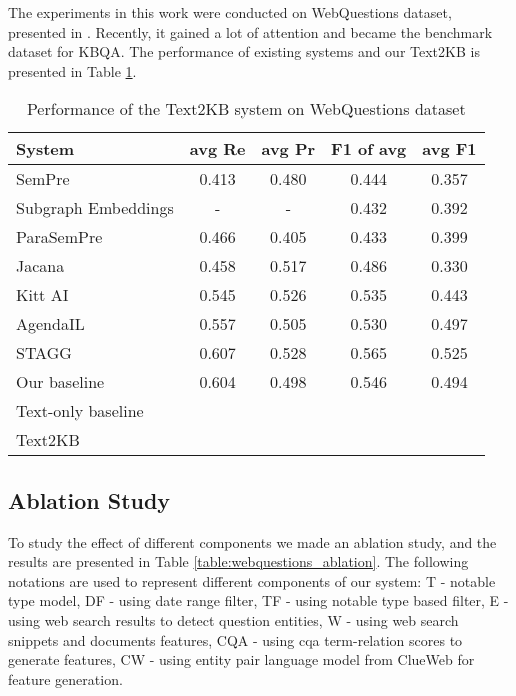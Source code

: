 
The experiments in this work were conducted on WebQuestions dataset, presented in \cite{Berant:EMNLP13}.
Recently, it gained a lot of attention and became the benchmark dataset for KBQA.
The performance of existing systems and our Text2KB is presented in Table \ref{table:webquestions_results}.

\begin{table}
\caption{Performance of the Text2KB system on WebQuestions dataset}
\label{table:webquestions_results}
\begin{tabular}{| p{2.7cm} | c | c | c | c | }
\hline
System & avg Re & avg Pr & F1 of avg & avg F1 \\
\hline
SemPre \cite{Berant:EMNLP13} & 0.413 & 0.480 & 0.444 & 0.357\\
Subgraph Embeddings \cite{BordesCW14:emnlp} & - & - & 0.432 & 0.392\\
ParaSemPre \cite{berant2014semantic} & 0.466 & 0.405 & 0.433 & 0.399\\
Jacana \cite{yao2014information} & 0.458 & 0.517 & 0.486 & 0.330\\
Kitt AI \cite{yao-scratch-qa-naacl2015} & 0.545 & 0.526 & 0.535 & 0.443\\
AgendaIL \cite{berant2015imitation} & 0.557 & 0.505 & 0.530 & 0.497\\
STAGG \cite{yih2015semantic} & 0.607 & 0.528 & 0.565 & 0.525\\
\hline
Our baseline \cite{ACCU:2015} & 0.604 & 0.498 & 0.546 & 0.494\\
Text-only baseline & & & & \\
Text2KB & & & & \\
\hline
\end{tabular}
\end{table}


\subsection{Ablation Study}

To study the effect of different components we made an ablation study, and the results are presented in Table \ref{table:webquestions_ablation}.
The following notations are used to represent different components of our system: T - notable type model, DF - using date range filter, TF - using notable type based filter, E - using web search results to detect question entities, W - using web search snippets and documents features, CQA - using cqa term-relation scores to generate features, CW - using entity pair language model from ClueWeb for feature generation.

